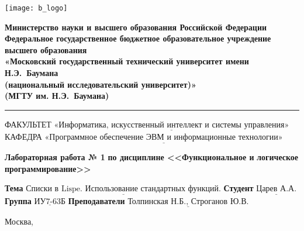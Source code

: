 \thispagestyle{empty}

\noindent \begin{minipage}{0.15\textwidth}
	\texttt{[image: b\_logo]}
\end{minipage}
\noindent\begin{minipage}{0.85\textwidth}\centering
	\textbf{Министерство науки и высшего образования Российской Федерации}\\
	\textbf{Федеральное государственное бюджетное образовательное учреждение высшего образования}\\
	\textbf{«Московский государственный технический университет имени Н.Э.~Баумана}\\
	\textbf{(национальный исследовательский университет)»}\\
	\textbf{(МГТУ им. Н.Э.~Баумана)}
\end{minipage}

\noindent\rule{\linewidth}{3pt}
\newline\newline
\noindent ФАКУЛЬТЕТ $\underline{\text{«Информатика, искусственный интеллект и системы управления»}}$ \newline\newline
\noindent КАФЕДРА $\underline{\text{«Программное обеспечение ЭВМ и информационные технологии»}}$

\vspace{1cm}

\begin{center}
	\noindent\begin{minipage}{1.3\textwidth}\centering
		\Large\textbf{  Лабораторная работа № 1}\newline
		\textbf{по дисциплине <<Функциональное и}\newline
		\textbf{логическое программирование>>}\newline\newline
	\end{minipage}
\end{center}

\noindent\textbf{Тема} $\underline{\text{Списки в Lispe. Использование стандартных функций.}}$\newline\newline
\noindent\textbf{Студент} $\underline{\text{Царев А.А.}}$\newline\newline
\noindent\textbf{Группа} $\underline{\text{ИУ7-63Б}}$\newline\newline
\noindent\textbf{Преподаватели} $\underline{\text{Толпинская Н.Б., Строганов Ю.В.}}$\newline

\begin{center}
	\vfill
	Москва,~\the\year
\end{center}
\clearpage
